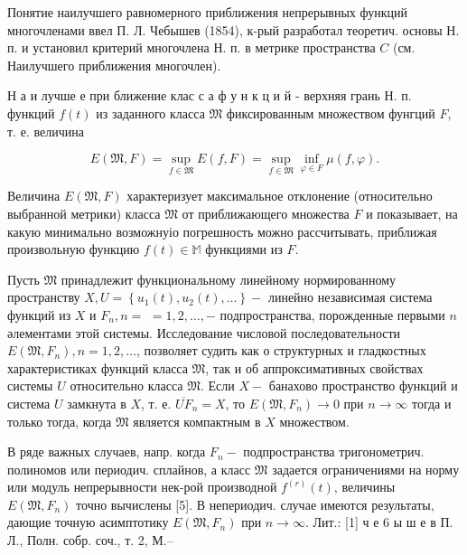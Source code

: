 \documentclass[10pt]{article}
\begin{document}
Понятие наилучшего равномерного приближения непрерывных функций многочленами ввел П. Л. Чебышев (1854), к-рый разработал теоретич. основы Н. п. и установил критерий многочлена Н. п. в метрике пространства $C$ (см. Наилучшего приближения многочлен).



Н а и лучше е при ближение клас с а ф у н к ц и й - верхняя грань Н. п. функций $f(t)$ из заданного класса $\mathfrak{M}$ фиксированным множеством фунгций $F$, т. е. величина



\[

E(\mathfrak{M}, F)=\sup _{f \in \mathfrak{M}} E(f, F)=\sup _{f \in \mathfrak{M}} \inf _{\varphi \in F} \mu(f, \varphi) .

\]



Величина $E(\mathfrak{M}, F)$ характеризует максимальное отклонение (относительно выбранной метрики) класса $\mathfrak{M}$ от приближающего множества $F$ и показывает, на какую минимально возможнуіо погрешность можно рассчитывать, приближая произвольную функцию $f(t) \in \mathbb{M}$ функциями из $F$.



Пусть $\mathfrak{M}$ принадлежит функциональному линейному нормированному пространству $X, U=\left\{u_{1}(t), u_{2}(t), \ldots\right\}-$ линейно независимая система функций из $X$ и $F_{n}, n=$ $=1,2, \ldots,-$ подпространства, порожденные первыми $n$ әлементами этой системы. Исследование числовой последовательности $E\left(\mathfrak{M}, F_{n}\right), n=1,2, \ldots$, позволяет судить как о структурных и гладкостных характеристиках функций класса $\mathfrak{M}$, так и об аппроксимативных свойствах системы $U$ относительно класса $\mathfrak{M}$. Если $X-$ банахово пространство функций и система $U$ замкнута в $X$, т. е. $\overline{U F}_{n}=X$, то $E\left(\mathfrak{M}, F_{n}\right) \rightarrow 0$ при $n \rightarrow \infty$ тогда и только тогда, когда $\mathfrak{M}$ является компактным в $X$ множеством.



В ряде важных случаев, напр. когда $F_{n}-$ подпространства тригонометрич. полиномов или периодич. сплайнов, а класс $\mathfrak{M}$ задается ограничениями на норму или модуль непрерывности нек-рой производной $f^{(r)}(t)$, величины $E\left(\mathfrak{M}, F_{n}\right)$ точно вычислены [5]. В непериодич. случае имеются результаты, дающие точную асимптотику $E\left(\mathfrak{M}, F_{n}\right)$ при $n \rightarrow \infty$. Лит.: [1] ч е 6 ы ш е в П. Л., Полн. собр. соч., т. 2, М.--
\end{document}
